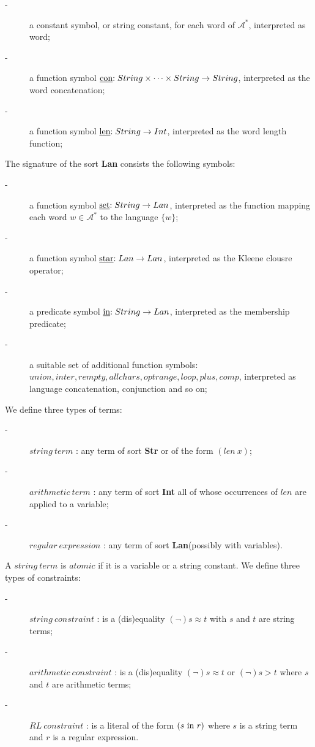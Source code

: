 \begin{description}
	\item[-] a constant symbol, or string constant, for each word of \(\mathcal{A}^* \), interpreted as word;
	\item[-] a function symbol \($\underline{con}$ : String \times \cdots \times String \to String\), interpreted as the word concatenation;
	\item[-] a function symbol \($\underline{len}$ : String  \to Int \), interpreted as the word length function;    
\end{description}
The signature of the sort  \textbf{Lan} consists the following symbols:
\begin{description}
	\item[-] a function symbol \($\underline{set}$ : String  \to Lan \), interpreted as the function mapping each word  \( w \in \mathcal{A}^* \) to the language  \(\{w\}\);
	\item[-] a function symbol \($\underline{star}$ : Lan \to Lan\), interpreted as the Kleene clousre operator;
	\item[-] a predicate symbol \($\underline{in}$ : String \to Lan\), interpreted as the membership predicate;	
	\item[-] a suitable set of additional function symbols: \(union, inter, rempty, allchars, opt range, loop, plus, comp \), interpreted as language concatenation, conjunction and so on;
\end{description}
We define three types of terms:
\begin{description}
	\item[-] \( string \ term \) : any term of sort \textbf{Str} or of the form \((len \ x )\);
	\item[-] \( arithmetic \ term \) : any term of sort \textbf{Int} all of whose occurrences of \(len\) are applied to a variable;
	\item[-] \( regular \ expression \) : any term of sort \textbf{Lan}(possibly with variables).
\end{description}
A \( string \ term \) is \( atomic \) if it is a variable or a string constant. We define three types of constraints:
\begin{description}
	\item[-] \( string \ constraint \) : is a (dis)equality  \( (\neg) s \approx t \) with \(s\) and \(t\) are string terms;
	\item[-] \( arithmetic \ constraint \) : is a (dis)equality  \( (\neg) s \approx t \) or \( (\neg) s > t \) where \(s\) and \(t\) are arithmetic terms;
	\item[-] \( RL \ constraint \) : is a literal of the form \((s \ \textnormal{in} \ r)\) where \(s\) is a string term and \(r\) is a regular expression.
\end{description}

